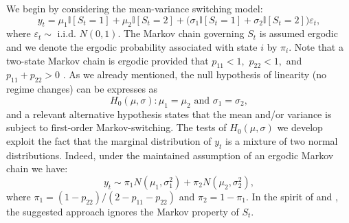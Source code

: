 \documentclass[11pt]{article}
\begin{document}
We begin by considering the mean-variance switching model: 
\begin{equation}
y_{t}=\mu _{1}\mathbb{I}[S_{t}=1]+\mu _{2}\mathbb{I}[S_{t}=2]+\big(\sigma
_{1}\mathbb{I}[S_{t}=1]+\sigma _{2}\mathbb{I}[S_{t}=2]\big)\varepsilon _{t},
\label{m0}
\end{equation}%
where $\varepsilon _{t}\sim $ i.i.d. $N(0,1)$. The Markov chain governing $%
S_{t}$ is assumed ergodic and we denote the ergodic probability associated
with state $i$ by $\pi _{i}.$ Note that a two-state Markov chain is ergodic
provided that $p_{11}<1,$ $p_{22}<1,$ and $p_{11}+p_{22}>0$ \citep[][p.
683]{Hamilton:1994}. As we already mentioned, the null hypothesis of
linearity (no regime changes) can be expresses as 
\begin{equation*}
H_{0}(\mu ,\sigma ):\mu _{1}=\mu _{2}\text{ and }\sigma _{1}=\sigma _{2},
\end{equation*}%
and a relevant alternative hypothesis states that the mean and/or variance
is subject to first-order Markov-switching. The tests of $H_{0}(\mu ,\sigma )
$ we develop exploit the fact that the marginal distribution of $y_{t}$ is a
mixture of two normal distributions. Indeed, under the maintained assumption
of an ergodic Markov chain we have: 
\begin{equation}
y_{t}\sim \pi _{1}N(\mu _{1},\sigma _{1}^{2})+\pi _{2}N(\mu _{2},\sigma
_{2}^{2}),  \label{mix}
\end{equation}%
where $\pi _{1}=(1-p_{22})/(2-p_{11}-p_{22})$ and $\pi _{2}=1-\pi _{1}$. In
the spirit of \cite{Cho-White:2007} and \citet{Carter-Steigerwald:2012,
Carter-Steigerwald:2013}, the suggested approach ignores the Markov property
of $S_{t}$.
\end{document}
